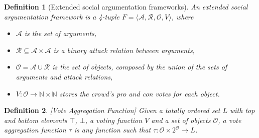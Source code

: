 \documentclass{article}
\date{ }
\newtheorem{definition}{Definition}
\newcommand{\nat}{\mathbb{N}}   %
\newcommand{\args}{\mathcal{A}} %
\newcommand{\att}{\mathcal{R}}  %
\newcommand{\valueset}{L}
\newcommand{\obj}{\mathcal{O}} %
\newcommand{\safid}{F}               %
\newcommand{\safbodyO}{\langle \args, \att, \obj, V \rangle} %
\newcommand{\safO}{\safid = \safbodyO} %
\begin{document}



\begin{definition}[Extended social argumentation frameworks]
An \emph{extended social argumentation framework} is a 4-tuple $\safO$, where
\begin{itemize}
  \item $\args$ is the set of arguments,
  \item $\att \subseteq \args \times \args$ is a binary attack relation between arguments,
  \item $\obj = \args \cup \att$ is the set of objects, composed by the union of the sets of arguments and attack relations,
  \item $V : \obj \to \nat \times \nat$ stores the crowd's pro and con votes for each object.
\end{itemize}
\end{definition}

\begin{definition}
\label{def:voteAgg}
[Vote Aggregation Function]
Given a totally ordered set $\valueset$ with top and bottom elements $\top$, $\bot$, a voting function $V$ and a set of objects $\obj$, a vote aggregation function $\tau$ is any function such that $\tau: \obj  \times {2}^{\obj} \to L$.
\end{definition}
\end{document}
